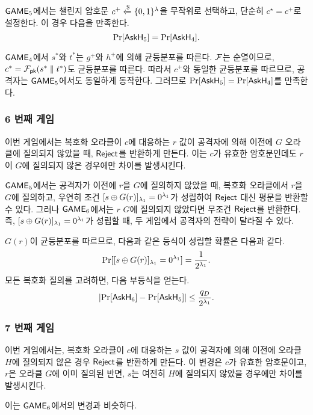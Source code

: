 $\game_5$에서는 챌린지 암호문 $c^+ \rgets \{0,1\}^{\sp}$을 무작위로 선택하고, 단순히
$c^\star = c^+$로 설정한다. 이 경우 다음을 만족한다.
$$
	\Pr[\askH_5] = \Pr[\askH_4].
$$

\begin{memo}
	$\game_4$에서 $s^*$와 $t^*$는 $g^+$와 $h^+$에 의해 균등분포를 따른다. $\td$는
	순열이므로, $c^* = \td_{\pk}(s^* \parallel t^*)$도 균등분포를 따른다. 따라서 $c^+$와
	동일한 균등분포를 따르므로, 공격자는 $\game_5$에서도 동일하게 동작한다.
	그러므로 $\Pr[\askH_5] = \Pr[\askH_4]$를 만족한다.
\end{memo}

\newpage
\subsubsection{6 번째 게임}

이번 게임에서는 복호화 오라클이 $c$에 대응하는 $r$ 값이 공격자에 의해 이전에 $G$
오라클에 질의되지 않았을 때, $\reject$를 반환하게 만든다. 이는 $c$가 유효한
암호문인데도 $r$이 $G$에 질의되지 않은 경우에만 차이를 발생시킨다. 

\begin{memo}
	$\game_5$에서는 공격자가 이전에 $r$을 $G$에 질의하지 않았을 때, 복호화
	오라클에서 $r$을 $G$에 질의하고, 우연히 조건 $[s \oplus G(r)]_{\sp_1} =
	0^{\sp_1}$가 성립하여 $\reject$ 대신 평문을 반환할 수 있다. 그러나
	$\game_6$에서는 $r$ $G$에 질의되지 않았다면 무조건 $\reject$를 반환한다. 즉,
	$[s \oplus G(r)]_{\sp_1} = 0^{\sp_1}$가 성립할 때, 두 게임에서 공격자의
	전략이 달라질 수 있다.
\end{memo}

$G(r)$이 균등분포를 따르므로, 다음과 같은 등식이 성립할 확률은 다음과 같다.
$$
	\Pr[[s \oplus G(r)]_{\sp_1} = 0^{\sp_1}] = \frac{1}{2^{\sp_1}}.
$$
모든 복호화 질의를 고려하면, 다음 부등식을 얻는다.
$$	
	\left| \Pr[\askH_6] - \Pr[\askH_5] \right| \leq \frac{q_D}{2^{\sp_1}}.
$$

\subsubsection{7 번째 게임}

이번 게임에서는, 복호화 오라클이 $c$에 대응하는 $s$ 값이 공격자에 의해 이전에
오라클 $H$에 질의되지 않은 경우 $\reject$를 반환하게 만든다. 이 변경은 $c$가
유효한 암호문이고, $r$은 오라클 $G$에 이미 질의된 반면, $s$는 여전히 $H$에
질의되지 않았을 경우에만 차이를 발생시킨다.

\begin{memo}
	이는 $\game_6$에서의 변경과 비슷하다.
\end{memo}


